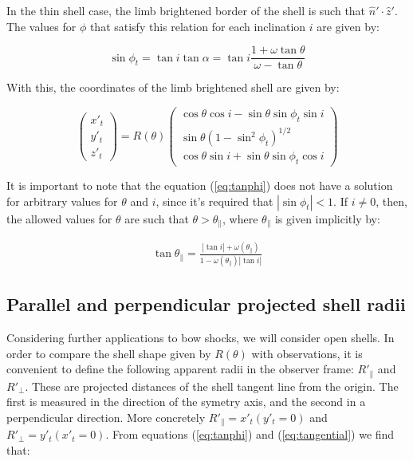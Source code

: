 In the thin shell case, the limb brightened border of the shell is such that $\hat{n}'\cdot \hat{z}'$. 
The values for $\phi$ that satisfy this relation for each inclination $i$ are given by:

\begin{equation}
\sin\phi_t = \tan i\tan\alpha = \tan i \frac{1+\omega\tan\theta}{\omega-\tan\theta}
\label{eq:tanphi}
\end{equation}

With this, the coordinates of the limb brightened shell are given by:

\begin{equation}
\left(\begin{array}{c}
x'_t \\ y'_t \\ z'_t
\end{array}\right)= R(\theta)\left(\begin{array}{c}
\cos\theta\cos i - \sin\theta\sin\phi_t \sin i \\
\sin\theta(1-\sin^2\phi_t)^{1/2} \\
\cos\theta\sin i +\sin\theta\sin\phi_t\cos i
\end{array}\right)
\label{eq:tangential}
\end{equation} 

It is important to note that the equation (\ref{eq:tanphi}) does not have a solution for arbitrary values for $\theta$ and $i$, since
it's required that $|\sin\phi_t|<1$. If $i\neq 0$, then, the  allowed values for $\theta$ are such that $\theta > \theta_\parallel$, where
$\theta_\parallel$ is given implicitly by:

\begin{align}
\tan\theta_\parallel = \frac{|\tan i| + \omega(\theta_\parallel)}{1-\omega(\theta_\parallel) |\tan i|}
\label{eq:thetapar}
\end{align}

\subsection{Parallel and perpendicular projected shell radii}

Considering further applications to bow shocks, we will consider open shells. In order to compare the shell shape given by $R(\theta)$ with observations,
it is convenient to define the following apparent radii in the observer frame: $R'_\parallel$ and $R'_\perp$. These are projected distances of the shell tangent line
from the origin. The first is measured in the direction of the symetry axis, and the second in a perpendicular direction. More concretely $R'_\parallel = x'_t(y'_t=0)$
and $R'_\perp = y'_t(x'_t=0)$. From equations (\ref{eq:tanphi}) and (\ref{eq:tangential}) we find that:

